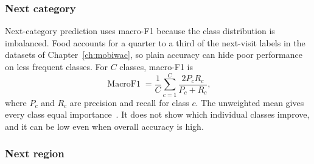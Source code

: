 \subsubsection{Next category}

Next-category prediction uses macro-F1 because the class distribution is imbalanced.
Food accounts for a quarter to a third of the next-visit labels in the datasets of
Chapter~\ref{ch:mobiwac}, so
plain accuracy can hide poor performance on less frequent classes. For $C$ classes,
macro-F1 is
\begin{equation}\label{eq:fund:macro-f1}
    \operatorname{MacroF1} = \frac{1}{C}\sum_{c=1}^{C}
    \frac{2P_cR_c}{P_c+R_c},
\end{equation}
where $P_c$ and $R_c$ are precision and recall for class $c$. The unweighted mean
gives every class equal importance~\cite{sokolova2009measures}. It does not show which
individual classes improve, and it can be low even when overall accuracy is high.

\subsubsection{Next region}


